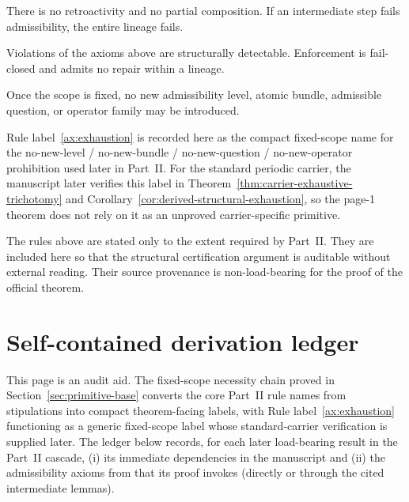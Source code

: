 \begin{axiom}\label{ax:composition}
There is no retroactivity and no partial composition. If an intermediate step fails admissibility,
the entire lineage fails.
\end{axiom}

\begin{axiom}\label{ax:enforcement}
Violations of the axioms above are structurally detectable. Enforcement is fail-closed and admits no
repair within a lineage.
\end{axiom}

\begin{rulelabel}\label{ax:exhaustion}
Once the scope is fixed, no new admissibility level, atomic bundle, admissible question, or operator
family may be introduced.
\end{rulelabel}

\begin{remark}
Rule label~\ref{ax:exhaustion} is recorded here as the compact fixed-scope name for the no-new-level /
no-new-bundle / no-new-question / no-new-operator prohibition used later in Part~II. For the standard
periodic carrier, the manuscript later verifies this label in Theorem~\ref{thm:carrier-exhaustive-trichotomy}
and Corollary~\ref{cor:derived-structural-exhaustion}, so the page-1 theorem does not rely on it as an
unproved carrier-specific primitive.
\end{remark}

\begin{remark}[Provenance]
The rules above are stated only to the extent required by Part~II. They are included here so that the structural certification argument is auditable without external reading. Their source provenance is non-load-bearing for the proof of the official theorem.
\end{remark}



\section{Self-contained derivation ledger}\label{sec:axiom-ledger}
This page is an audit aid. The fixed-scope necessity chain proved in Section~\ref{sec:primitive-base} converts the core Part~II rule names from stipulations into compact theorem-facing labels, with Rule label~\ref{ax:exhaustion} functioning as a generic fixed-scope label whose standard-carrier verification is supplied later. The ledger below records, for each later load-bearing result in the Part~II cascade, (i) its immediate dependencies in the manuscript and (ii) the admissibility axioms from
 that its proof invokes (directly or through the cited intermediate lemmas).

